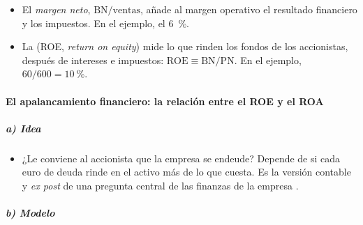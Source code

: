 \documentclass[11pt]{article}
\begin{document}
\begin{itemize}
\item El \emph{margen neto}, $\mathrm{BN}/\text{ventas}$, añade al margen operativo el resultado financiero y los impuestos. En el ejemplo, el 6~\%.
\item La  (ROE, \emph{return on equity}) mide lo que rinden los fondos de los accionistas, después de intereses e impuestos: $\mathrm{ROE}\equiv\mathrm{BN}/\mathrm{PN}$. En el ejemplo, $60/600=10~\%$.
\end{itemize}

\paragraph{El apalancamiento financiero: la relación entre el ROE y el ROA}\label{sec:apalancamiento-financiero}

\subparagraph{a) Idea}

\begin{itemize}
\item ¿Le conviene al accionista que la empresa se endeude? Depende de si cada euro de deuda rinde en el activo más de lo que cuesta. Es la versión contable y \emph{ex post} de una pregunta central de las finanzas de la empresa .
\end{itemize}

\subparagraph{b) Modelo}
\end{document}
